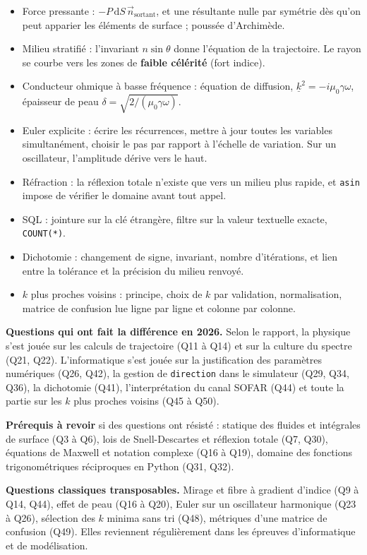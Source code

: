 \documentclass[11pt,a4paper]{article}
\providecommand{\tightlist}{\setlength{\itemsep}{0pt}\setlength{\parskip}{0pt}}
\begin{document}
\begin{itemize}
\tightlist
\item
  Force pressante : \(-P\,\mathrm{d}S\,\vec n_{\text{sortant}}\), et une résultante nulle par symétrie dès qu'on peut apparier les éléments de surface ; poussée d'Archimède.
\item
  Milieu stratifié : l'invariant \(n\sin\theta\) donne l'équation de la trajectoire. Le rayon se courbe vers les zones de \textbf{faible célérité} (fort indice).
\item
  Conducteur ohmique à basse fréquence : équation de diffusion, \(\underline k^2 = -i\mu_0\gamma\omega\), épaisseur de peau \(\delta = \sqrt{2/(\mu_0\gamma\omega)}\).
\item
  Euler explicite : écrire les récurrences, mettre à jour toutes les variables simultanément, choisir le pas par rapport à l'échelle de variation. Sur un oscillateur, l'amplitude dérive vers le haut.
\item
  Réfraction : la réflexion totale n'existe que vers un milieu plus rapide, et \texttt{asin} impose de vérifier le domaine avant tout appel.
\item
  SQL : jointure sur la clé étrangère, filtre sur la valeur textuelle exacte, \texttt{COUNT(*)}.
\item
  Dichotomie : changement de signe, invariant, nombre d'itérations, et lien entre la tolérance et la précision du milieu renvoyé.
\item
  \(k\) plus proches voisins : principe, choix de \(k\) par validation, normalisation, matrice de confusion lue ligne par ligne et colonne par colonne.
\end{itemize}

\textbf{Questions qui ont fait la différence en 2026.} Selon le rapport, la physique s'est jouée sur les calculs de trajectoire (Q11 à Q14) et sur la culture du spectre (Q21, Q22). L'informatique s'est jouée sur la justification des paramètres numériques (Q26, Q42), la gestion de \texttt{direction} dans le simulateur (Q29, Q34, Q36), la dichotomie (Q41), l'interprétation du canal SOFAR (Q44) et toute la partie sur les \(k\) plus proches voisins (Q45 à Q50).

\textbf{Prérequis à revoir} si des questions ont résisté : statique des fluides et intégrales de surface (Q3 à Q6), lois de Snell-Descartes et réflexion totale (Q7, Q30), équations de Maxwell et notation complexe (Q16 à Q19), domaine des fonctions trigonométriques réciproques en Python (Q31, Q32).

\textbf{Questions classiques transposables.} Mirage et fibre à gradient d'indice (Q9 à Q14, Q44), effet de peau (Q16 à Q20), Euler sur un oscillateur harmonique (Q23 à Q26), sélection des \(k\) minima sans tri (Q48), métriques d'une matrice de confusion (Q49). Elles reviennent régulièrement dans les épreuves d'informatique et de modélisation.
\end{document}
